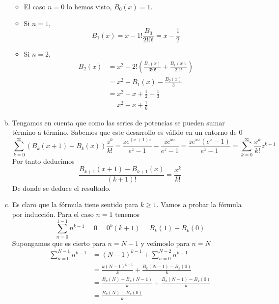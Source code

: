 \documentclass[twoside]{article}
\begin{document}
\begin{solucion}
\begin{enumerate}[(a)]
\begin{itemize}
\item El caso $n=0$ lo hemos visto, $B_0(x)=1$.
\item Si $n=1$,
$$
B_1(x)=x-1!\frac{B_0}{2!0!}=x-\frac{1}{2}
$$
\item Si $n=2$,
\begin{align*}
B_2(x)&=x^2 - 2!\left(\frac{B_0(x)}{3!0!}+\frac{B_1(x)}{2!1!}\right)\\
&= x^2 -B_1(x) - \frac{B_0(x)}{3}\\
&=x^2 -x+\frac{1}{2}-\frac{1}{3}\\
&= x^2-x + \frac{1}{6}
\end{align*}
\end{itemize}
%
\item Tengamos en cuenta que como las series de potencias se pueden sumar término a término. Sabemos que este desarrollo es válido en un entorno de $0$
$$
\sum_{k=0}^\infty(B_k(x+1)-B_k(x))\frac{z^k}{k!}=\frac{ze^{(x+1)z}}{e^z-1}- \frac{ze^{xz}}{e^z-1} = \frac{ze^{xz}(e^z-1)}{e^z-1} = \sum_{k=0}^\infty \frac{x^{k}}{k!}z^{k+1}
$$
Por tanto deducimos
$$
\frac{B_{k+1}(x+1)-B_{k+1}(x)}{(k+1)!} = \frac{x^k}{k!}
$$
De donde se deduce el resultado.
\item Es claro que la fórmula tiene sentido para $k\geq 1$. Vamos a probar la fórmula por inducción. Para el caso $n=1$ tenemos
$$\sum_{n=0}^{1-1} n^{k-1} =0= 0^k(k+1)  = B_k(1)-B_k(0)
$$
Supongamos que es cierto para $n=N-1$ y veámoslo para $n=N$
\begin{align*}
\sum_{n=0}^{N-1} n^{k-1} &= (N-1)^{k-1} + \sum_{n=0}^{N-2} n^{k-1} \\
&=\frac{k(N-1)^{k-1}}{k}+ \frac{B_k(N-1)-B_k(0)}{k} \\
&=\frac{B_k(N)-B_k(N-1)}{k}  + \frac{B_k(N-1)-B_k(0)}{k}\\
&= \frac{B_k(N)-B_k(0)}{k}
\end{align*}
\end{enumerate}
\end{solucion}
\end{document}
